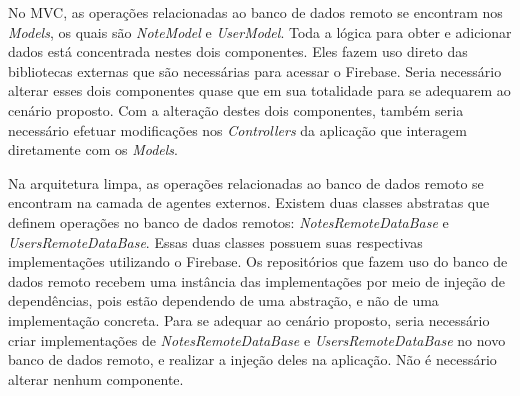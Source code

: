 No MVC, as operações relacionadas ao banco de dados remoto se encontram nos \emph{Models}, os quais são \emph{NoteModel} e \emph{UserModel}.
Toda a lógica para obter e adicionar dados está concentrada nestes dois componentes.
Eles fazem uso direto das bibliotecas externas que são necessárias para acessar o Firebase.
Seria necessário alterar esses dois componentes quase que em sua totalidade para se adequarem ao cenário proposto.
Com a alteração destes dois componentes, também seria necessário efetuar modificações nos \emph{Controllers} da aplicação que interagem diretamente com os \emph{Models}.

Na arquitetura limpa, as operações relacionadas ao banco de dados remoto se encontram na camada de agentes externos.
Existem duas classes abstratas que definem operações no banco de dados remotos: \emph{NotesRemoteDataBase} e \emph{UsersRemoteDataBase}.
Essas duas classes possuem suas respectivas implementações utilizando o Firebase.
Os repositórios que fazem uso do banco de dados remoto recebem uma instância das implementações por meio de injeção de dependências, pois estão dependendo de uma abstração, e não de uma implementação concreta.
Para se adequar ao cenário proposto, seria necessário criar implementações de \emph{NotesRemoteDataBase} e \emph{UsersRemoteDataBase} no novo banco de dados remoto, e realizar a injeção deles na aplicação.
Não é necessário alterar nenhum componente.